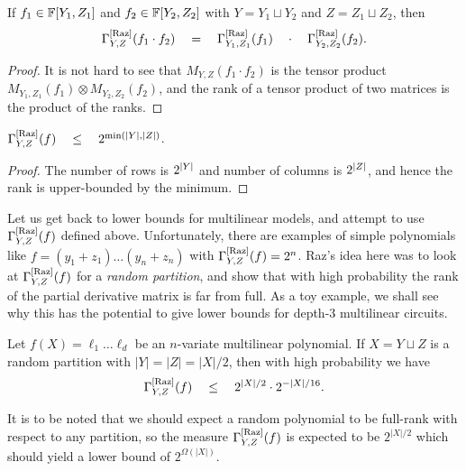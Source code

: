 \begin{observation}[Multiplicativity]\label{obs:pdm-multiplicativity}
If $f_1 \in \mathbb{F}[Y_1,Z_1]$ and $f_2 \in \mathbb{F}[Y_2, Z_2]$ with $Y = Y_1 \sqcup Y_2$ and $Z = Z_1 \sqcup Z_2$, then
$$
\Gamma^{\mathrm{[Raz]}}_{Y,Z}(f_1\cdot f_2) \quad = \quad \Gamma^{\mathrm{[Raz]}}_{Y_1, Z_1}(f_1) \quad \cdot \quad \Gamma^{\mathrm{[Raz]}}_{Y_2, Z_2}(f_2).
$$
\end{observation}
\begin{proof}
  It is not hard to see that $M_{Y,Z}(f_1\cdot f_2)$ is the tensor product $M_{Y_1, Z_1}(f_1) \otimes M_{Y_2, Z_2}(f_2)$, and the rank of a tensor product of two matrices is the product of the ranks.
\end{proof}

\begin{observation}\label{obs:pdm-upperbound}
  $\Gamma^{\mathrm{[Raz]}}_{Y,Z}(f) \quad \leq \quad 2^{\min(\left|Y\right|, \left|Z\right|)}$.
\end{observation}
\begin{proof}
  The number of rows is $2^{\left|Y\right|}$ and number of columns is $2^{\left|Z\right|}$, and hence the rank is upper-bounded by the minimum.
\end{proof}


Let us get back to lower bounds for multilinear models, and attempt to use $\Gamma^{\mathrm{[Raz]}}_{Y,Z}(f)$ defined above. Unfortunately, there are examples of simple polynomials like $f = (y_1 + z_1)\dots (y_n + z_n)$ with $\Gamma^{\mathrm{[Raz]}}_{Y,Z}(f) = 2^n$. Raz's idea here was to look at $\Gamma^{\mathrm{[Raz]}}_{Y,Z}(f)$ for a \emph{random partition}, and show that with high probability the rank of the partial derivative matrix is far from full. As a toy example, we shall see why this has the potential to give lower bounds for depth-$3$ multilinear circuits. 

\begin{lemma}\label{lem:raz-depth-three}
Let $f(X) = \ell_1 \dots \ell_d$ be an $n$-variate multilinear polynomial. If $X = Y\sqcup Z$ is a random partition with $|Y| = |Z| = |X|/2$, then with high probability we have
$$
\Gamma^{\mathrm{[Raz]}}_{Y,Z}(f) \quad \leq \quad 2^{|X|/2} \cdot 2^{-|X|/16}.
$$
\end{lemma}

It is to be noted that we should expect a random polynomial to be full-rank with respect to any partition, so the measure $\Gamma^{\mathrm{[Raz]}}_{Y,Z}(f)$ is expected to be $2^{|X|/2}$ which should yield a lower bound of $2^{\Omega(|X|)}$. 

